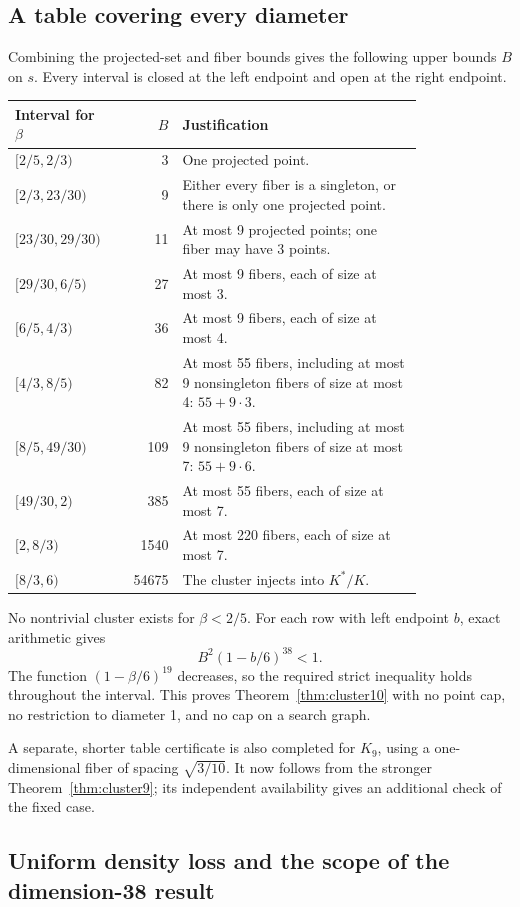 \documentclass[11pt,a4paper]{article}
\theoremstyle{remark}\newtheorem{remark}[theorem]{Remark}
\begin{document}
\subsection{A table covering every diameter}

Combining the projected-set and fiber bounds gives the following upper bounds $B$ on $s$. Every interval is closed at the left endpoint and open at the right endpoint.
\begin{longtable}{P{0.22\linewidth}rP{0.59\linewidth}}
\toprule
Interval for $\beta$ &$B$&Justification\\\midrule
\endhead
$[2/5,2/3)$&3&One projected point.\\
$[2/3,23/30)$&9&Either every fiber is a singleton, or there is only one projected point.\\
$[23/30,29/30)$&11&At most 9 projected points; one fiber may have 3 points.\\
$[29/30,6/5)$&27&At most 9 fibers, each of size at most 3.\\
$[6/5,4/3)$&36&At most 9 fibers, each of size at most 4.\\
$[4/3,8/5)$&82&At most 55 fibers, including at most 9 nonsingleton fibers of size at most 4: $55+9\cdot3$.\\
$[8/5,49/30)$&109&At most 55 fibers, including at most 9 nonsingleton fibers of size at most 7: $55+9\cdot6$.\\
$[49/30,2)$&385&At most 55 fibers, each of size at most 7.\\
$[2,8/3)$&1540&At most 220 fibers, each of size at most 7.\\
$[8/3,6)$&54675&The cluster injects into $K^*/K$.\\
\bottomrule
\end{longtable}
No nontrivial cluster exists for $\beta<2/5$. For each row with left endpoint $b$, exact arithmetic gives
\[
B^2(1-b/6)^{38}<1.
\]
The function $(1-\beta/6)^{19}$ decreases, so the required strict inequality holds throughout the interval. This proves Theorem~\ref{thm:cluster10} with no point cap, no restriction to diameter 1, and no cap on a search graph.

A separate, shorter table certificate is also completed for $K_9$, using a one-dimensional fiber of spacing $\sqrt{3/10}$. It now follows from the stronger Theorem~\ref{thm:cluster9}; its independent availability gives an additional check of the fixed case.

\subsection{Uniform density loss and the scope of the dimension-38 result}
\end{document}
